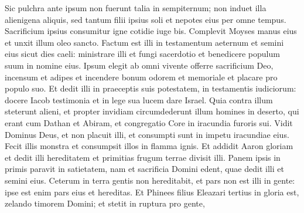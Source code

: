 \begin{biblechapter}
\begin{biblechapter}
\begin{biblechapter}
\begin{biblechapter}
\begin{biblechapter}
\begin{biblechapter}
\begin{biblechapter}
\begin{biblechapter}
\begin{biblechapter}
\begin{biblechapter}
\begin{biblechapter}
\begin{biblechapter}
\begin{biblechapter}
\begin{biblechapter}
\begin{biblechapter}
\begin{biblechapter}
\begin{biblechapter}
\begin{biblechapter}
\begin{biblechapter}
\begin{biblechapter}
\begin{biblechapter}
\begin{biblechapter}
\begin{biblechapter}
\begin{biblechapter}
\begin{biblechapter}
\begin{biblechapter}
\begin{biblechapter}
\begin{biblechapter}
\begin{biblechapter}
\begin{biblechapter}
\begin{biblechapter}
\begin{biblechapter}
\begin{biblechapter}
\begin{biblechapter}
\begin{biblechapter}
\begin{biblechapter}
\begin{biblechapter}
\begin{biblechapter}
\begin{biblechapter}
\begin{biblechapter}
\begin{biblechapter}
\begin{biblechapter}
\begin{biblechapter}
\begin{biblechapter}
\begin{biblechapter}
 \verse Sic pulchra ante ipsum non fuerunt talia in sempiternum;
 \verse non induet illa alienigena aliquis,
 sed tantum filii ipsius soli
 et nepotes eius per omne tempus.
 \verse Sacrificium ipsius consumitur
 igne cotidie iuge bis.
 \verse Complevit Moyses manus eius
 et unxit illum oleo sancto.
 \verse Factum est illi in testamentum aeternum
 et semini eius sicut dies caeli:
 ministrare illi et fungi sacerdotio
 et benedicere populum suum in nomine eius.
 \verse Ipsum elegit ab omni vivente
 offerre sacrificium Deo, incensum et adipes
 et incendere bonum odorem et memoriale
 et placare pro populo suo.
 \verse Et dedit illi in praeceptis suis potestatem,
 in testamentis iudiciorum:
 docere Iacob testimonia
 et in lege sua lucem dare Israel.
 \verse Quia contra illum steterunt alieni,
 et propter invidiam circumdederunt illum homines in deserto,
 qui erant cum Dathan et Abiram,
 et congregatio Core in iracundia furoris sui.
 \verse Vidit Dominus Deus, et non placuit illi,
 et consumpti sunt in impetu iracundiae eius.
 \verse Fecit illis monstra
 et consumpsit illos in flamma ignis.
 \verse Et addidit Aaron gloriam
 et dedit illi hereditatem
 et primitias frugum terrae divisit illi.
 \verse Panem ipsis in primis paravit in satietatem,
 nam et sacrificia Domini edent,
 quae dedit illi et semini eius.
 \verse Ceterum in terra gentis non hereditabit,
 et pars non est illi in gente:
 ipse est enim pars eius et hereditas.
 \verse Et Phinees filius Eleazari tertius in gloria est,
 zelando timorem Domini;
 \verse et stetit in ruptura pro gente,

\end{biblechapter}
\end{biblechapter}
\end{biblechapter}
\end{biblechapter}
\end{biblechapter}
\end{biblechapter}
\end{biblechapter}
\end{biblechapter}
\end{biblechapter}
\end{biblechapter}
\end{biblechapter}
\end{biblechapter}
\end{biblechapter}
\end{biblechapter}
\end{biblechapter}
\end{biblechapter}
\end{biblechapter}
\end{biblechapter}
\end{biblechapter}
\end{biblechapter}
\end{biblechapter}
\end{biblechapter}
\end{biblechapter}
\end{biblechapter}
\end{biblechapter}
\end{biblechapter}
\end{biblechapter}
\end{biblechapter}
\end{biblechapter}
\end{biblechapter}
\end{biblechapter}
\end{biblechapter}
\end{biblechapter}
\end{biblechapter}
\end{biblechapter}
\end{biblechapter}
\end{biblechapter}
\end{biblechapter}
\end{biblechapter}
\end{biblechapter}
\end{biblechapter}
\end{biblechapter}
\end{biblechapter}
\end{biblechapter}
\end{biblechapter}
